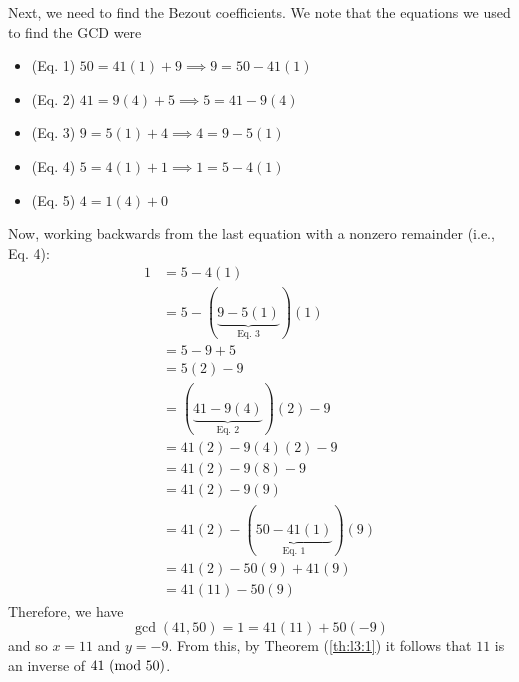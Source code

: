 \documentclass[letterpaper]{article}
\begin{document}
\begin{mdframed}
\begin{itemize}
\begin{mdframed}
            \bigskip 

            Next, we need to find the Bezout coefficients. We note that the equations we used to find the GCD were
            \begin{itemize}
                \item (Eq. 1) $50 = 41(1) + 9 \implies 9 = 50 - 41(1)$
                \item (Eq. 2) $41 = 9(4) + 5 \implies 5 = 41 - 9(4)$
                \item (Eq. 3) $9 = 5(1) + 4 \implies 4 = 9 - 5(1)$
                \item (Eq. 4) $5 = 4(1) + 1 \implies 1 = 5 - 4(1)$
                \item (Eq. 5) $4 = 1(4) + 0$
            \end{itemize}
            
            Now, working backwards from the last equation with a nonzero remainder (i.e., Eq. 4):
            \begin{equation*}
                \begin{aligned}
                    1 &= 5 - 4(1) \\ 
                        &= 5 - (\underbrace{9 - 5(1)}_{\text{Eq. 3}})(1) \\ 
                        &= 5 - 9 + 5 \\ 
                        &= 5(2) - 9 \\ 
                        &= (\underbrace{41 - 9(4)}_{\text{Eq. 2}})(2) - 9 \\ 
                        &= 41(2) - 9(4)(2) - 9 \\ 
                        &= 41(2) - 9(8) - 9 \\ 
                        &= 41(2) - 9(9) \\ 
                        &= 41(2) - (\underbrace{50 - 41(1)}_{\text{Eq. 1}})(9) \\ 
                        &= 41(2) - 50(9) + 41(9) \\ 
                        &= 41(11) - 50(9)
                \end{aligned}
            \end{equation*}
            Therefore, we have 
            \[\gcd(41, 50) = 1 = 41(11) + 50(-9)\]
            and so $x = 11$ and $y = -9$. From this, by Theorem (\ref{th:l3:1}) it follows that $\boxed{11}$ is an inverse of $41 \ (\mathrm{mod}\ 50)$. 
        \end{mdframed}
    \end{itemize}
\end{mdframed}
\end{document}
